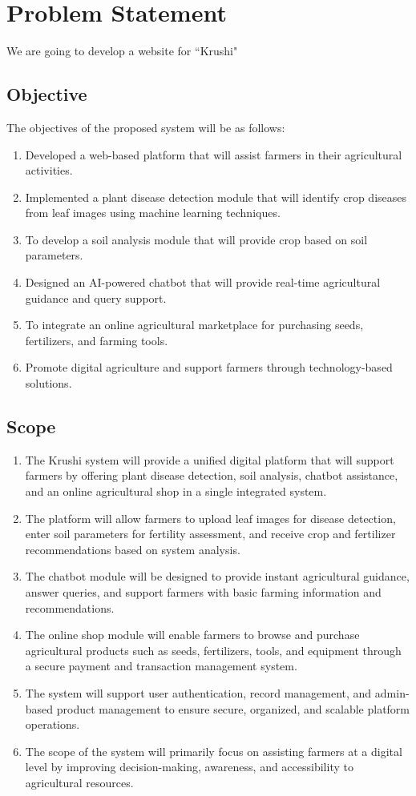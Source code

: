 \chapter{Problem Statement}

We are going to develop a website for ``Krushi"
\section{Objective}
The objectives of the proposed system will be as follows:
\begin{enumerate}
\item  Developed a web-based platform that will assist farmers in their agricultural activities. 
\item Implemented a plant disease detection module that will identify crop diseases from leaf images using machine learning techniques. 
\item  To develop a soil analysis module that will provide crop based on soil parameters. 
\item Designed an AI-powered chatbot that will provide real-time agricultural guidance and query support. 
\item To integrate an online agricultural marketplace for purchasing seeds, fertilizers, and farming tools. 
\item Promote digital agriculture and support farmers through technology-based solutions.
\end{enumerate}
\newpage
\section{Scope}
\begin{enumerate}
\item The Krushi system will provide a unified digital platform that will support farmers by offering
plant disease detection, soil analysis, chatbot assistance, and an online agricultural shop in a
single integrated system. 
\item The platform will allow farmers to upload leaf images for disease detection, enter soil
parameters for fertility assessment, and receive crop and fertilizer recommendations based on
system analysis. 
\item  The chatbot module will be designed to provide instant agricultural guidance, answer queries, and support farmers with basic farming information and recommendations. 
\item The online shop module will enable farmers to browse and purchase agricultural products such
as seeds, fertilizers, tools, and equipment through a secure payment and transaction
management system. 
\item The system will support user authentication, record management, and admin-based product
management to ensure secure, organized, and scalable platform operations. 
\item The scope of the system will primarily focus on assisting farmers at a digital level by improving
decision-making, awareness, and accessibility to agricultural resources.
\end{enumerate}
\newpage
